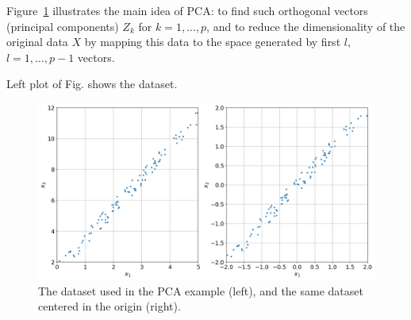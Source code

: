 Figure~\ref{fig:pca_dataset} illustrates the main idea of PCA: to find such orthogonal vectors (principal components) $Z_k$ for $k = 1,\ldots, p$, and to reduce the dimensionality of the original data $X$ by mapping this data to the space generated by first $l$, $l = 1,\ldots, p - 1$ vectors. %


Left plot of Fig. shows the dataset.
\begin{figure}[htb]
	\centering
	\includegraphics[width=0.9\linewidth]{figures/pca_dataset_both}
	\caption{The dataset used in the PCA example (left), and the same dataset centered in the origin (right).}
	\label{fig:pca_dataset}
\end{figure}


